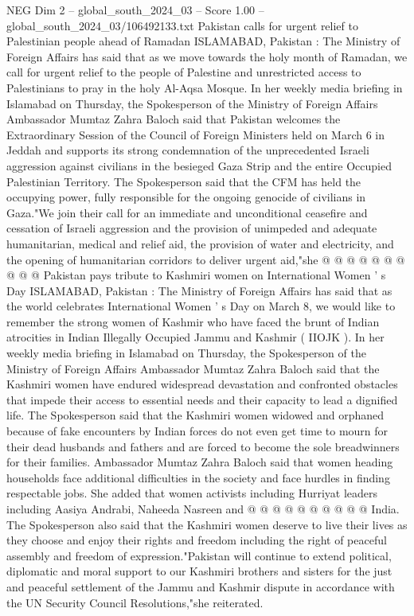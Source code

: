 \begin{textsample}{NEG Dim 2 – global\_south\_2024\_03 – Score 1.00 – global\_south\_2024\_03/106492133.txt}  \label{ex:f2_neg_112}
Pakistan calls for urgent relief to Palestinian people ahead of Ramadan ISLAMABAD, Pakistan : The Ministry of Foreign Affairs has said that as we move towards the holy month of Ramadan, we call for urgent relief to the people of Palestine and unrestricted access to Palestinians to pray in the holy Al-Aqsa Mosque.
In her weekly media briefing in Islamabad on Thursday, the Spokesperson of the Ministry of Foreign Affairs Ambassador Mumtaz Zahra Baloch said that Pakistan welcomes the Extraordinary Session of the Council of Foreign Ministers held on March 6 in Jeddah and supports its strong condemnation of the unprecedented Israeli aggression against civilians in the besieged Gaza Strip and the entire Occupied Palestinian Territory.
The Spokesperson said that the CFM has held the occupying power, fully responsible for the ongoing genocide of civilians in Gaza."We join their call for an immediate and unconditional ceasefire and cessation of Israeli aggression and the provision of unimpeded and adequate humanitarian, medical and relief aid, the provision of water and electricity, and the opening of humanitarian corridors to deliver urgent aid,"she @ @ @ @ @ @ @ @ @ @ Pakistan pays tribute to Kashmiri women on International Women ' s Day ISLAMABAD, Pakistan : The Ministry of Foreign Affairs has said that as the world celebrates International Women ' s Day on March 8, we would like to remember the strong women of Kashmir who have faced the brunt of Indian atrocities in Indian Illegally Occupied Jammu and Kashmir ( IIOJK ).
In her weekly media briefing in Islamabad on Thursday, the Spokesperson of the Ministry of Foreign Affairs Ambassador Mumtaz Zahra Baloch said that the Kashmiri women have endured widespread devastation and confronted obstacles that impede their access to essential needs and their capacity to lead a dignified life.
The Spokesperson said that the Kashmiri women widowed and orphaned because of fake encounters by Indian forces do not even get time to mourn for their dead husbands and fathers and are forced to become the sole breadwinners for their families.
Ambassador Mumtaz Zahra Baloch said that women heading households face additional difficulties in the society and face hurdles in finding respectable jobs.
She added that women activists including Hurriyat leaders including Aasiya Andrabi, Naheeda Nasreen and @ @ @ @ @ @ @ @ @ @ India.
The Spokesperson also said that the Kashmiri women deserve to live their lives as they choose and enjoy their rights and freedom including the right of peaceful assembly and freedom of expression."Pakistan will continue to extend political, diplomatic and moral support to our Kashmiri brothers and sisters for the just and peaceful settlement of the Jammu and Kashmir dispute in accordance with the UN Security Council Resolutions,"she reiterated.

\end{textsample}

